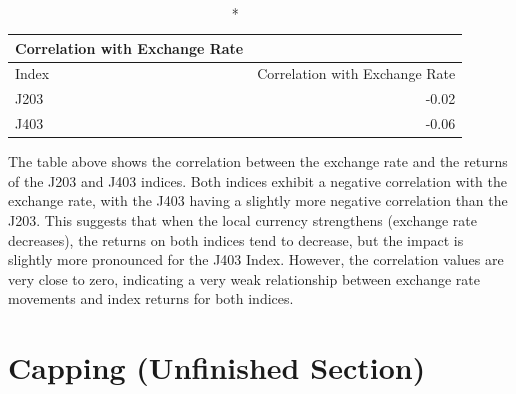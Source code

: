 \documentclass[11pt,preprint, authoryear]{elsarticle}
\numberwithin{equation}{section}
\numberwithin{figure}{section}
\numberwithin{table}{section}
\begin{document}
\begin{longtable}{lr}
\caption*{
{\large Correlation with Exchange Rate}
} \\ 
\toprule
Index & Correlation with Exchange Rate \\ 
\midrule
J203 & -0.02 \\ 
J403 & -0.06 \\ 
\bottomrule
\end{longtable}

The table above shows the correlation between the exchange rate and the
returns of the J203 and J403 indices. Both indices exhibit a negative
correlation with the exchange rate, with the J403 having a slightly more
negative correlation than the J203. This suggests that when the local
currency strengthens (exchange rate decreases), the returns on both
indices tend to decrease, but the impact is slightly more pronounced for
the J403 Index. However, the correlation values are very close to zero,
indicating a very weak relationship between exchange rate movements and
index returns for both indices.

\hypertarget{capping-unfinished-section}{%
\section{Capping (Unfinished
Section)}\label{capping-unfinished-section}}


\end{document}
